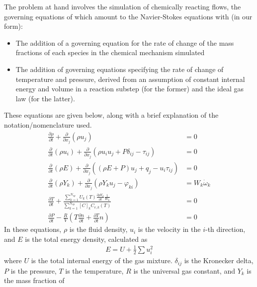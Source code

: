 The problem at hand involves the simulation of chemically reacting flows, the
governing equations of which amount to the Navier-Stokes equations with (in
our form):
\begin{itemize}
\item{The addition of a governing equation for the rate of change of the
      mass fractions of each species in the chemical mechanism simulated}
\item{The addition of governing equations specifying the rate of change of
      temperature and pressure, derived from an assumption of constant
      internal energy and volume in a reaction substep (for the former)
      and the ideal gas law (for the latter).}
\end{itemize}
These equations are given below, along with a brief explanation of the notation/nomenclature
used.
\begin{align}
\frac{\partial \rho}{\partial t} + \frac{\partial}{\partial x_{j}}(\rho u_{j}) &= 0 \label{eq:consmass} \\
\frac{\partial}{\partial t}(\rho u_{i}) + \frac{\partial}{\partial x_{j}}(\rho u_{i} u_{j} + P\delta_{ij} - \tau_{ij}) &= 0 \label{eq:consmom} \\
\frac{\partial}{\partial t}(\rho E) + \frac{\partial}{\partial x_{j}}((\rho E + P)u_{j} + q_{j} - u_{i}\tau_{ij}) &= 0 \label{eq:conse} \\
\frac{\partial}{\partial t}(\rho Y_{k}) + \frac{\partial}{\partial x_{j}}(\rho Y_{k} u_{j} - \varphi_{ki}) &= W_{k}\dot{\omega}_{k} \label{eq:conssp}\\
\frac{\partial T}{\partial t} + \frac{\sum_{k=1}^{N_{sp}}U_{k}(T)\frac{\partial \rho Y_{k}}{\partial t}\frac{1}{W_{k}}}{\sum_{k=1}^{N_{sp}}[C]_{k}C_{v,k}(T)} &= 0 \label{eq:temp} \\
\frac{\partial P}{\partial t} - \frac{R}{V}(T\frac{\partial n}{\partial t} + \frac{\partial T}{\partial t}n) &= 0 \label{eq:pres}
\end{align}
In these equations, $\rho$ is the fluid density, $u_{i}$ is the velocity in the $i$-th direction, and $E$ is the total energy density,
calculated as
\begin{align}
E = U + \frac{1}{2} \sum u_{i}^{2}
\end{align}
where $U$ is the total internal energy of the gas mixture.
$\delta_{ij}$ is the Kronecker delta, $P$ is the pressure, $T$ is the temperature, $R$ is the universal gas constant, and $Y_{k}$ is the mass fraction of
